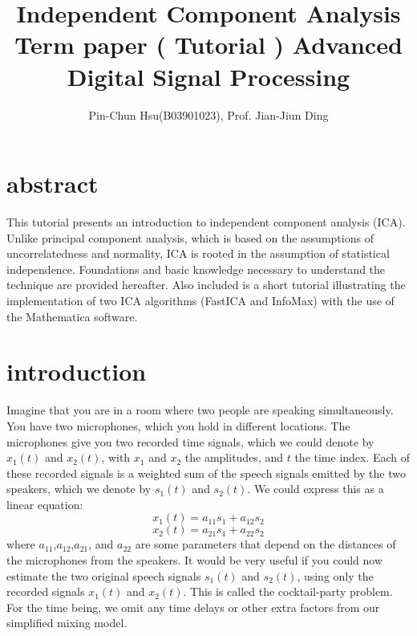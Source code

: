 \documentclass[12pt, a4paper, onecolumn]{IEEEtran}
\title{%
    Independent Component Analysis \\
  \large Term paper ( Tutorial ) Advanced Digital Signal Processing }
\author{Pin-Chun Hsu(B03901023), Prof. Jian-Jiun Ding}
\begin{document}
\maketitle
\section{abstract}
This tutorial presents an introduction to independent component analysis (ICA). Unlike principal component analysis, which is based on the assumptions of uncorrelatedness and  normality,  ICA  is  rooted  in  the  assumption  of  statistical  independence. Foundations and basic knowledge necessary to understand the technique are provided hereafter. Also included is a short  tutorial illustrating the implementation of two ICA algorithms (FastICA and InfoMax) with the use of the Mathematica software.
\section{introduction}

Imagine that you are in a room where two people are speaking simultaneously. You have two microphones, which you hold in different locations. The microphones give you two recorded time signals, which we could denote by $x_1(t)$ and $x_2(t)$, with $x_1$ and $x_2$ the amplitudes, and $t$ the time index. Each of these recorded signals is a weighted sum of the speech signals emitted by the two speakers, which we denote by $s_1(t)$ and $s_2(t)$. We could express this as a linear equation:
\begin{equation}
x_1(t) = a_{11}s_1 + a_{12}s_2
\end{equation}
\begin{equation}
x_2(t) = a_{21}s_1 + a_{22}s_2
\end{equation}
where $a_{11}$,$a_{12}$,$a_{21}$, and $a_{22}$ are some parameters that depend on the distances of the microphones from the speakers. It would be very useful if you could now estimate the two original speech signals $s_1(t)$ and $s_2(t)$, using only the recorded signals $x_1(t)$ and $x_2(t)$. This is called the cocktail-party problem. For the time being, we omit any time delays or other extra factors from our simplified mixing model.
\end{document}
